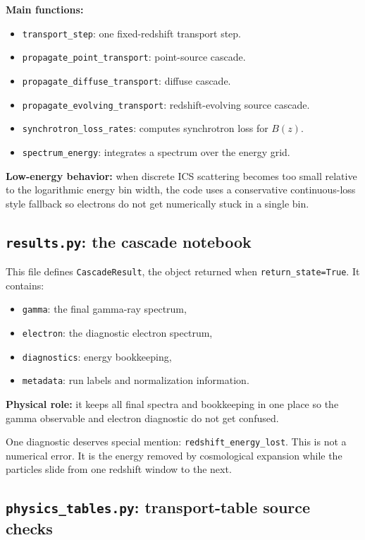 \documentclass[11pt]{article}
\newcommand{\code}[1]{\texttt{#1}}
\begin{document}
\textbf{Main functions:}
\begin{itemize}
  \item \code{transport\_step}: one fixed-redshift transport step.
  \item \code{propagate\_point\_transport}: point-source cascade.
  \item \code{propagate\_diffuse\_transport}: diffuse cascade.
  \item \code{propagate\_evolving\_transport}: redshift-evolving source cascade.
  \item \code{synchrotron\_loss\_rates}: computes synchrotron loss for $B(z)$.
  \item \code{spectrum\_energy}: integrates a spectrum over the energy grid.
\end{itemize}

\textbf{Low-energy behavior:} when discrete ICS scattering becomes too small
relative to the logarithmic energy bin width, the code uses a conservative
continuous-loss style fallback so electrons do not get numerically stuck in a
single bin.

\subsection{\code{results.py}: the cascade notebook}

This file defines \code{CascadeResult}, the object returned when
\code{return\_state=True}. It contains:
\begin{itemize}
  \item \code{gamma}: the final gamma-ray spectrum,
  \item \code{electron}: the diagnostic electron spectrum,
  \item \code{diagnostics}: energy bookkeeping,
  \item \code{metadata}: run labels and normalization information.
\end{itemize}

\textbf{Physical role:} it keeps all final spectra and bookkeeping in one place
so the gamma observable and electron diagnostic do not get confused.

One diagnostic deserves special mention: \code{redshift\_energy\_lost}. This is
not a numerical error. It is the energy removed by cosmological expansion while
the particles slide from one redshift window to the next.

\subsection{\code{physics\_tables.py}: transport-table source checks}
\end{document}
